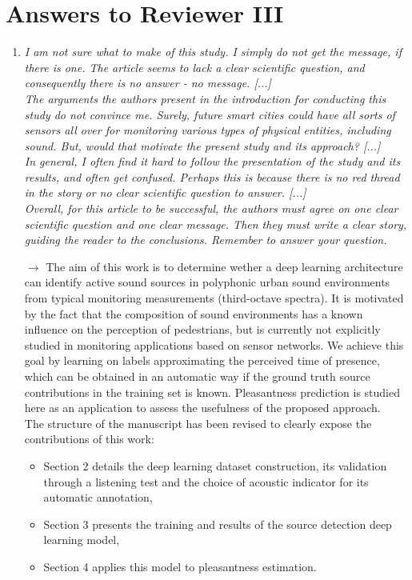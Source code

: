\documentclass[10pt]{article}
\begin{document}
\section{Answers to Reviewer III}

\begin{enumerate}

\item \emph{I am not sure what to make of this study. I simply do not get the message, if there is one. The article seems to lack a clear scientific question, and consequently there is no answer - no message. [...]\\
The arguments the authors present in the introduction for conducting this study do not convince me. Surely, future smart cities could have all sorts of sensors all over for monitoring various types of physical entities, including sound. But, would that motivate the present study and its approach? [...]\\
In general, I often find it hard to follow the presentation of the study and its results, and often get confused. Perhaps this is because there is no red thread in the story or no clear scientific question to answer. [...]\\
Overall, for this article to be successful, the authors must agree on one clear scientific question and one clear message. Then they must write a clear story, guiding the reader to the conclusions. Remember to answer your question.}

$\rightarrow$ The aim of this work is to determine wether a deep learning architecture can identify active sound sources in polyphonic urban sound environments from typical monitoring measurements (third-octave spectra). It is motivated by the fact that the composition of sound environments has a known influence on the perception of pedestrians, but is currently not explicitly studied in monitoring applications based on sensor networks. We achieve this goal by learning on labels approximating the perceived time of presence, which can be obtained in an automatic way if the ground truth source contributions in the training set is known. Pleasantness prediction is studied here as an application to assess the usefulness of the proposed approach.\\
The structure of the manuscript has been revised to clearly expose the contributions of this work:
\begin{itemize}
\item Section 2 details the deep learning dataset construction, its validation through a listening test and the choice of acoustic indicator for its automatic annotation,
\item Section 3 presents the training and results of the source detection deep learning model,
\item Section 4 applies this model to pleasantness estimation.
\end{itemize}



\end{enumerate}
\end{document}
